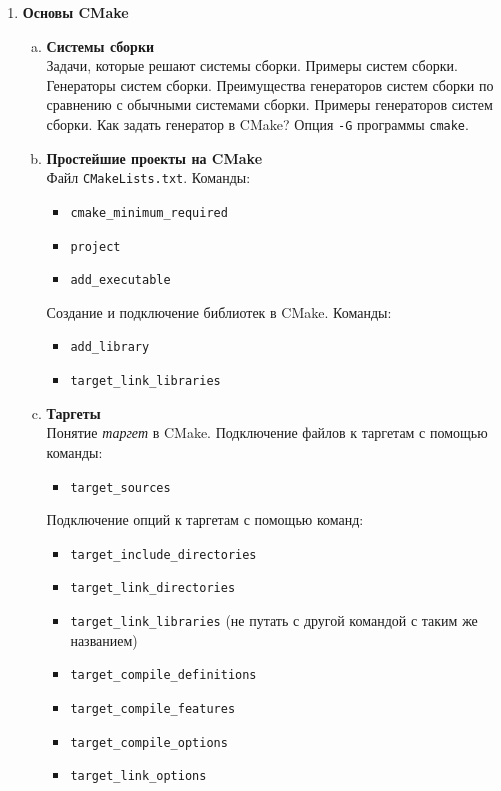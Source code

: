 \documentclass{article}
\begin{document}
\begin{enumerate}
\begin{enumerate}[a.]
\end{enumerate}


\newpage
\item \textbf{Основы CMake}
\begin{enumerate}[a.]
\item \textbf{Системы сборки}\\
Задачи, которые решают системы сборки. Примеры систем сборки. Генераторы систем сборки.
Преимущества генераторов систем сборки по сравнению с обычными системами сборки. Примеры генераторов систем сборки. Как задать генератор в CMake? Опция \texttt{-G} программы \texttt{cmake}.

\item \textbf{Простейшие проекты на CMake}\\
Файл \texttt{CMakeLists.txt}. Команды:
\begin{itemize}
\item \texttt{cmake\_minimum\_required}
\item \texttt{project}
\item \texttt{add\_executable}
\end{itemize}
Создание и подключение библиотек в CMake. Команды:
\begin{itemize}
\item \texttt{add\_library}
\item \texttt{target\_link\_libraries}
\end{itemize}


\item \textbf{Таргеты}\\
Понятие \textit{таргет} в CMake. 
Подключение файлов к таргетам с помощью команды:
\begin{itemize}
\item \texttt{target\_sources}
\end{itemize}

Подключение опций к таргетам с помощью команд:
\begin{itemize}
\item \texttt{target\_include\_directories}
\item \texttt{target\_link\_directories}
\item \texttt{target\_link\_libraries} (не путать с другой командой с таким же названием)
\item \texttt{target\_compile\_definitions}
\item \texttt{target\_compile\_features}
\item \texttt{target\_compile\_options}
\item \texttt{target\_link\_options}
\end{itemize}


\end{enumerate}
\end{enumerate}
\end{document}
